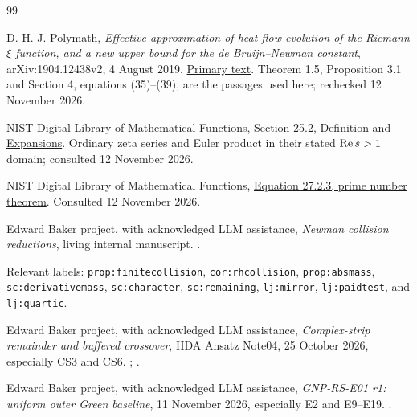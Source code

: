 \begin{thebibliography}{99}

D. H. J. Polymath,
\emph{Effective approximation of heat flow evolution of the Riemann
\(\xi\) function, and a new upper bound for the de Bruijn--Newman constant},
arXiv:1904.12438v2, 4 August 2019.
\href{https://arxiv.org/html/1904.12438v2}{Primary text}.
Theorem 1.5, Proposition 3.1 and Section 4, equations (35)--(39),
are the passages used here; rechecked 12 November 2026.

NIST Digital Library of Mathematical Functions,
\href{https://dlmf.nist.gov/25.2}{Section 25.2, Definition and Expansions}.
Ordinary zeta series and Euler product in their stated
\(\operatorname{Re} s>1\) domain; consulted 12 November 2026.

NIST Digital Library of Mathematical Functions,
\href{https://dlmf.nist.gov/27.2#E3}{Equation 27.2.3, prime number theorem}.
Consulted 12 November 2026.

Edward Baker project, with acknowledged LLM assistance,
\emph{Newman collision reductions}, living internal manuscript.
.
{\raggedright Relevant labels: \texttt{prop:finitecollision}, \texttt{cor:rhcollision},
\texttt{prop:absmass}, \texttt{sc:derivativemass},
\texttt{sc:character}, \texttt{sc:remaining}, \texttt{lj:mirror},
\texttt{lj:paidtest}, and \texttt{lj:quartic}.\par}

Edward Baker project, with acknowledged LLM assistance,
\emph{Complex-strip remainder and buffered crossover}, HDA Ansatz
Note04, 25 October 2026, especially CS3 and CS6.
;
.

Edward Baker project, with acknowledged LLM assistance,
\emph{GNP-RS-E01 r1: uniform outer Green baseline},
11 November 2026, especially E2 and E9--E19.
.


\end{thebibliography}
